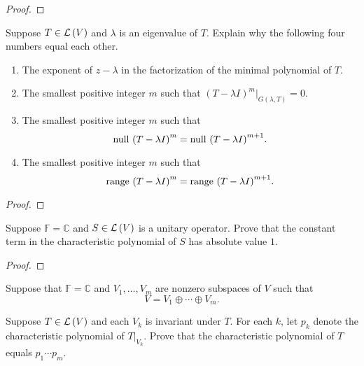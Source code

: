 \begin{proof}
\end{proof}
\newpage

\begin{exercise}\label{chapter8:sectionB:exercise18}
    Suppose $T\in\mathcal{L}\left({V}\right)$ and $\lambda$ is an eigenvalue of $T$. Explain why the following four numbers equal each other.
    \begin{enumerate}[label={(\alph*)}]
        \item The exponent of $z - \lambda$ in the factorization of the minimal polynomial of $T$.
        \item The smallest positive integer $m$ such that ${(T - \lambda I)}^{m}\vert_{G(\lambda, T)} = 0$.
        \item The smallest positive integer $m$ such that
              \[
                  \operatorname{null}\,{{(T - \lambda I)}^{m}} = \operatorname{null}\,{{(T - \lambda I)}^{m+1}}.
              \]
        \item The smallest positive integer $m$ such that
              \[
                  \operatorname{range}\,{{(T - \lambda I)}^{m}} = \operatorname{range}\,{{(T - \lambda I)}^{m+1}}.
              \]
    \end{enumerate}
\end{exercise}

\begin{proof}
\end{proof}
\newpage

\begin{exercise}\label{chapter8:sectionB:exercise19}
    Suppose $\mathbb{F} = \mathbb{C}$ and $S \in \mathcal{L}\left({V}\right)$ is a unitary operator. Prove that the constant term in the characteristic polynomial of $S$ has absolute value $1$.
\end{exercise}

\begin{proof}
\end{proof}
\newpage

\begin{exercise}\label{chapter8:sectionB:exercise20}
    Suppose that $\mathbb{F} = \mathbb{C}$ and $V_{1}, \ldots, V_{m}$ are nonzero subspaces of $V$ such that
    \[
        V = V_{1}\oplus \cdots \oplus V_{m}.
    \]

    Suppose $T\in\mathcal{L}\left({V}\right)$ and each $V_{k}$ is invariant under $T$. For each $k$, let $p_{k}$ denote the characteristic polynomial of $T\vert_{V_{k}}$. Prove that the characteristic polynomial of $T$ equals $p_{1}\cdots p_{m}$.
\end{exercise}

